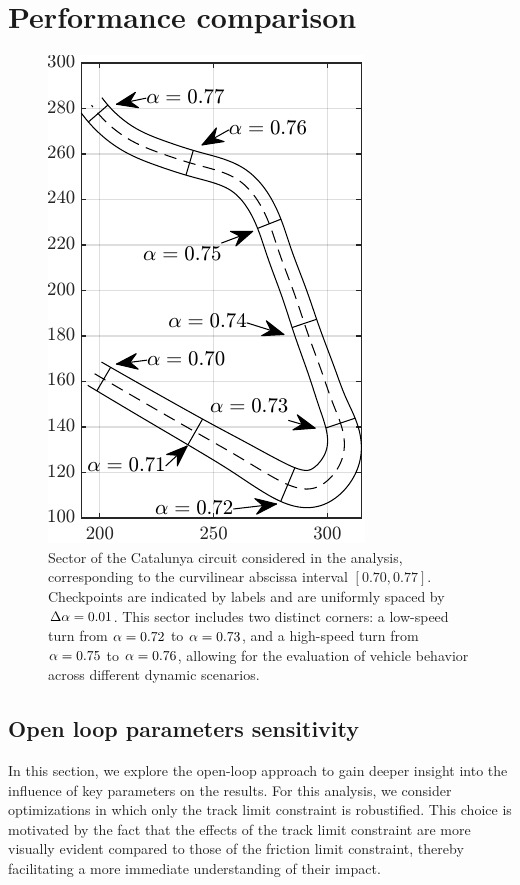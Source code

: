 \section{Performance comparison} 
\label{sec:performance_comparison}

\begin{figure}
	\centering
	\includegraphics{Fig/track.pdf}
	\caption{Sector of the Catalunya circuit considered in the analysis, corresponding to the curvilinear abscissa interval $\left[0.70, 0.77\right]$. Checkpoints are indicated by labels and are uniformly spaced by $\Delta\alpha=0.01$. This sector includes two distinct corners: a low-speed turn from $\alpha = 0.72$ to $\alpha = 0.73$, and a high-speed turn from $\alpha = 0.75$ to $\alpha = 0.76$, allowing for the evaluation of vehicle behavior across different dynamic scenarios.}
	\label{fig:track}
\end{figure}

\subsection{Open loop parameters sensitivity}
\label{sec:ol_param_sensitivity}
In this section, we explore the open-loop approach to gain deeper insight into the influence of key parameters on the results. For this analysis, we consider optimizations in which only the track limit constraint is robustified. This choice is motivated by the fact that the effects of the track limit constraint are more visually evident compared to those of the friction limit constraint, thereby facilitating a more immediate understanding of their impact. 

